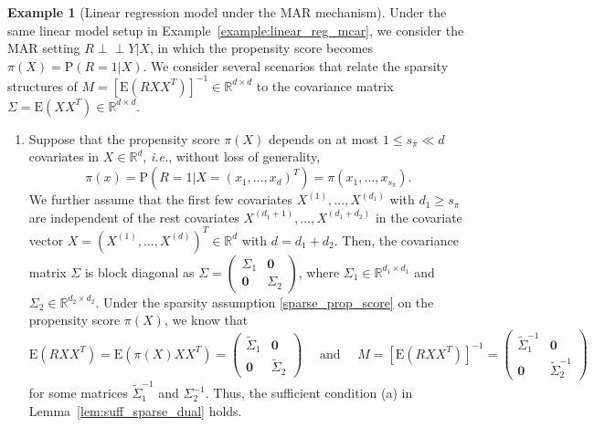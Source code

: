 \documentclass[ejsv2,noshowframe]{imsart}
\theoremstyle{plain}
\theoremstyle{definition}
\newtheorem*{example}{Example}
\theoremstyle{remark}
\newcommand{\ind}{{\perp\!\!\!\perp}}
\renewcommand{\tilde}{\widetilde}
\begin{document}
\begin{example}[Linear regression model under the MAR mechanism]
	\label{example:linear_reg_mar}
	Under the same linear model setup in Example~\ref{example:linear_reg_mcar}, we consider the MAR setting $R\ind Y|X$, in which the propensity score becomes $\pi(X) = \mathrm{P}(R=1|X)$. We consider several scenarios that relate the sparsity structures of $M= \left[\mathrm{E}(RXX^T) \right]^{-1} \in \mathbb{R}^{d\times d}$ to the covariance matrix $\Sigma=\mathrm{E}(XX^T) \in \mathbb{R}^{d\times d}$.
	\begin{enumerate}
		\item Suppose that the propensity score $\pi(X)$ depends on at most $1\leq s_{\pi} \ll d$ covariates in $X\in \mathbb{R}^d$, \emph{i.e.}, without loss of generality,
		\begin{equation}
			\label{sparse_prop_score}
			\pi(x)=\mathrm{P}\left(R=1|X=(x_1,...,x_d)^T\right) = \pi(x_1,...,x_{s_{\pi}}).
		\end{equation}
		We further assume that the first few covariates $X^{(1)},...,X^{(d_1)}$ with $d_1 \geq s_{\pi}$ are independent of the rest covariates $X^{(d_1+1)},...,X^{(d_1+d_2)}$ in the covariate vector $X=\left(X^{(1)},...,X^{(d)}\right)^T \in \mathbb{R}^d$ with $d=d_1+d_2$. Then, the covariance matrix $\Sigma$ is block diagonal as $\Sigma = \begin{pmatrix}
			\Sigma_1 & \bm{0}\\
			\bm{0} & \Sigma_2
		\end{pmatrix}$, where $\Sigma_1\in \mathbb{R}^{d_1\times d_1}$ and $\Sigma_2\in \mathbb{R}^{d_2\times d_2}$. Under the sparsity assumption \eqref{sparse_prop_score} on the propensity score $\pi(X)$, we know that
		$$\mathrm{E}(RXX^T)=\mathrm{E}\left(\pi(X)XX^T\right)= \begin{pmatrix}
			\tilde{\Sigma}_1 & \bm{0}\\
			\bm{0} & \tilde{\Sigma}_2
		\end{pmatrix} \quad \text{ and } \quad M=\left[\mathrm{E}(RXX^T)\right]^{-1} = \begin{pmatrix}
			\tilde{\Sigma}_1^{-1} & \bm{0}\\
			\bm{0} & \tilde{\Sigma}_2^{-1}
		\end{pmatrix}$$
	for some matrices $\tilde{\Sigma}_1^{-1}$ and $\Sigma_2^{-1}$. Thus, the sufficient condition (a) in Lemma~\ref{lem:suff_sparse_dual} holds.
		

\end{enumerate}
\end{example}
\end{document}
